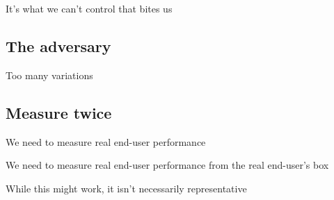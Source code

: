 \documentclass{beamer}
\begin{document}
\begin{frame}{}
  \begin{center}
  It's what we can't control that bites us
  \end{center}
\end{frame}

\subsection{The adversary}

\begin{frame}{Too many variations}
  \begin{center}
  \LARGE{
  }
  \end{center}
\end{frame}

\subsection{Measure twice}

\begin{frame}{}
  \begin{center}
  We need to measure real end-user performance
  \end{center}
\end{frame}

\begin{frame}{}
  \begin{center}
  We need to measure real end-user performance from the real end-user's box
  \end{center}
\end{frame}

\begin{frame}{}
  \begin{center}
  \end{center}
\end{frame}

\begin{frame}{}
  \begin{center}
  While this might work, it isn't necessarily representative
  \end{center}
\end{frame}
\end{document}
